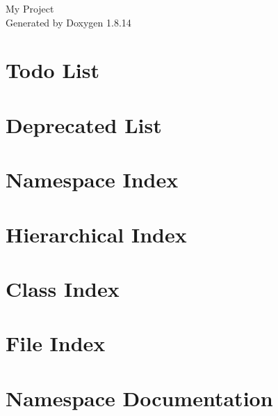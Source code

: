 \documentclass[twoside]{book}
\newcommand{\+}{\discretionary{\mbox{\scriptsize$\hookleftarrow$}}{}{}}
\newcommand{\clearemptydoublepage}{%
  \newpage{\pagestyle{empty}\cleardoublepage}%
}
\begin{document}
\hypersetup{pageanchor=false,
             bookmarksnumbered=true,
             pdfencoding=unicode
            }
\begin{titlepage}
\vspace*{7cm}
\begin{center}%
{\Large My Project }\\
\vspace*{1cm}
{\large Generated by Doxygen 1.8.14}\\
\end{center}
\end{titlepage}
\clearemptydoublepage
{}
\tableofcontents
\clearemptydoublepage
{}
\hypersetup{pageanchor=true}

\chapter{Todo List}
\label{todo}

\chapter{Deprecated List}
\label{deprecated}

\chapter{Namespace Index}

\chapter{Hierarchical Index}

\chapter{Class Index}

\chapter{File Index}

\chapter{Namespace Documentation}








\end{document}

